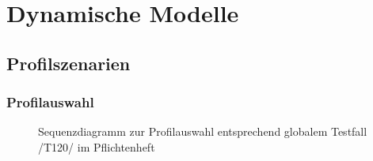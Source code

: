 \section{Dynamische Modelle}

\subsection{Profilszenarien}

\subsubsection{Profilauswahl}
\begin{figure}[H]
\centering
{}
\caption{Sequenzdiagramm zur Profilauswahl entsprechend globalem Testfall /T120/ im Pflichtenheft}
\end{figure}

